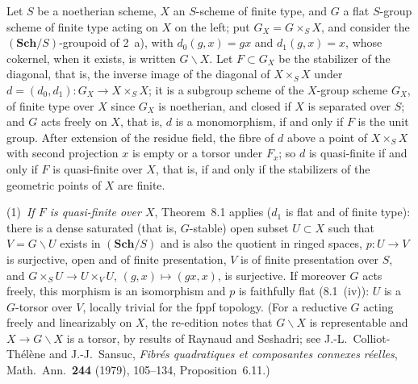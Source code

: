 Let \(S\) be a noetherian scheme, \(X\) an \(S\)-scheme of finite type, and
\(G\) a flat \(S\)-group scheme of finite type acting on \(X\) on the left; put
\(G_X=G\times_SX\), and consider the \((\mathbf{Sch}/S)\)-groupoid of 2~a), with
\(d_0(g,x)=gx\) and \(d_1(g,x)=x\), whose cokernel, when it exists, is written
\(G\backslash X\). Let \(F\subset G_X\) be the stabilizer of the diagonal, that is,
the inverse image of the diagonal of \(X\times_SX\) under
\(d=(d_0,d_1)\colon G_X\to X\times_SX\); it is a subgroup scheme of the
\(X\)-group scheme \(G_X\), of finite type over \(X\) since \(G_X\) is noetherian,
and closed if \(X\) is separated over \(S\); and \(G\) acts freely on \(X\), that
is, \(d\) is a monomorphism, if and only if \(F\) is the unit group. After
extension of the residue field, the fibre of \(d\) above a point of
\(X\times_SX\) with second projection \(x\) is empty or a torsor under \(F_x\);
so \(d\) is quasi-finite if and only if \(F\) is quasi-finite over \(X\), that
is, if and only if the stabilizers of the geometric points of \(X\) are
finite.

(1)~\emph{If \(F\) is quasi-finite over \(X\)}, Theorem~8.1 applies (\(d_1\) is flat
and of finite type): there is a dense saturated (that is, \(G\)-stable)
open subset \(U\subset X\) such that \(V=G\backslash U\) exists in \((\mathbf{Sch}/S)\) and
is also the quotient in ringed spaces, \(p\colon U\to V\) is surjective, open
and of finite presentation, \(V\) is of finite presentation over \(S\), and
\(G\times_SU\to U\times_VU\), \((g,x)\mapsto(gx,x)\), is surjective. If moreover
\(G\) acts freely, this morphism is an isomorphism and \(p\) is faithfully
flat (8.1~(iv)): \(U\) is a \(G\)-torsor over \(V\), locally trivial for the fppf
topology. (For a reductive \(G\) acting freely and linearizably on \(X\), the
re-edition notes that \(G\backslash X\) is representable and \(X\to G\backslash X\) is a
torsor, by results of Raynaud and Seshadri; see J.-L.~Colliot-Thélène and
J.-J.~Sansuc, \emph{Fibrés quadratiques et composantes connexes réelles},
Math.\ Ann.\ \textbf{244} (1979), 105--134, Proposition~6.11.)

